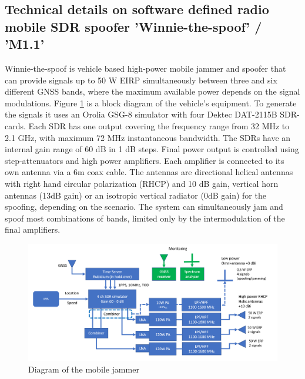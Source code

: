 \subsection{Technical details on software defined radio mobile SDR spoofer 'Winnie-the-spoof' / 'M1.1'}
Winnie-the-spoof is vehicle based high-power mobile jammer and spoofer that can provide signals up to 50 W EIRP simultaneously between three and six different GNSS bands,
 where the maximum available power depends on the signal modulations. Figure \ref{fig: M1.1-1 Winnie-the-spoof} is a block diagram of the vehicle's equipment. 
 To generate the signals it uses an Orolia GSG-8 simulator with four Dektec DAT-2115B SDR-cards. 
 Each SDR has one output covering the frequency range from 32 MHz to 2.1 GHz, with maximum 72 MHz instantaneous bandwidth. 
 The SDRs have an internal gain range of 60 dB in 1 dB steps. Final power output is controlled using step-attenuators and high power amplifiers. 
 Each amplifier is connected to its own antenna via a 6m coax cable. 
 The antennas are directional helical antennas with right hand circular polarization (RHCP) and 10 dB gain, 
 vertical horn antennas (13dB gain) or an isotropic vertical radiator (0dB gain) for the spoofing, depending on the scenario. 
 The system can simultaneously jam and spoof most combinations of bands, limited only by the intermodulation of the final amplifiers.

\begin{figure}[H]
    \includegraphics[width=\textwidth]{graphics/appendixG/2025.04.29_M1.1_Winnie-the-spoof.png}
    \caption{Diagram of the mobile jammer}
    \label{fig: M1.1-1 Winnie-the-spoof}
\end{figure}


